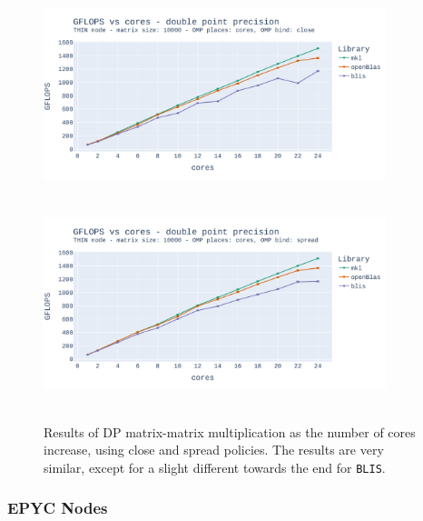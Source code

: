 \documentclass{report}
\begin{document}
\begin{figure}[h]
\hspace*{-2.5cm}
\includegraphics[width=10cm, height=6cm]{./images/fixed_size_thin_double_gflops_close.pdf}
\includegraphics[width=10cm, height=6cm]{./images/fixed_size_thin_double_gflops_spread.pdf}
\caption{\label{fig:fixed_size_thin_double} Results of DP matrix-matrix multiplication 
as the number of cores increase, using close and spread policies. The results are 
very similar, except for a slight different towards the end for \texttt{BLIS}.}
\end{figure}

\subsubsection{EPYC Nodes}
\end{document}
